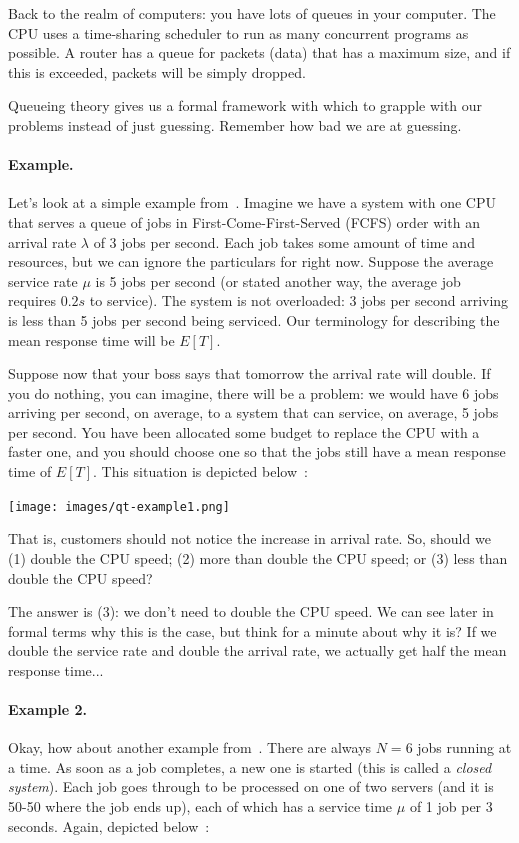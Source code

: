 \documentclass[a4paper]{report}
\begin{document}
Back to the realm of computers: you have lots of queues in your computer. The CPU uses a time-sharing scheduler to run as many concurrent programs as possible. A router has a queue for packets (data) that has a maximum size, and if this is exceeded, packets will be simply dropped. 

Queueing theory gives us a formal framework with which to grapple with our problems instead of just guessing. Remember how bad we are at guessing. 


\paragraph{Example.} Let's look at a simple example from~\cite{pmd}. Imagine we have a system with one CPU that serves a queue of jobs in First-Come-First-Served (FCFS) order with an arrival rate $\lambda$ of 3 jobs per second. Each job takes some amount of time and resources, but we can ignore the particulars for right now. Suppose the average service rate $\mu$ is 5 jobs per second (or stated another way, the average job requires $0.2s$ to service). The system is not overloaded: 3 jobs per second arriving is less than 5 jobs per second being serviced. Our terminology for describing the mean response time will be $E[T]$. 


Suppose now that your boss says that tomorrow the arrival rate will double. If you do nothing, you can imagine, there will be a problem: we would have 6 jobs arriving per second, on average, to a system that can service, on average, 5 jobs per second. You have been allocated some budget to replace the CPU with a faster one, and you should choose one so that the jobs still have a mean response time of $E[T]$. This situation is depicted below~\cite{pmd}:


\begin{center}
	\texttt{[image: images/qt-example1.png]}
\end{center}

That is, customers should not notice the increase in arrival rate. So, should we (1) double the CPU speed; (2) more than double the CPU speed; or (3) less than double the CPU speed?

The answer is (3): we don't need to double the CPU speed. We can see later in formal terms why this is the case, but think for a minute about why it is? If we double the service rate and double the arrival rate, we actually get half the mean response time...

\paragraph{Example 2.} Okay, how about another example from~\cite{pmd}. There are always $N=6$ jobs running at a time. As soon as a job completes, a new one is started (this is called a \textit{closed system}). Each job goes through to be processed on one of two servers (and it is 50-50 where the job ends up), each of which has a service time $\mu$ of 1 job per 3 seconds. Again, depicted below~\cite{pmd}:
\end{document}
